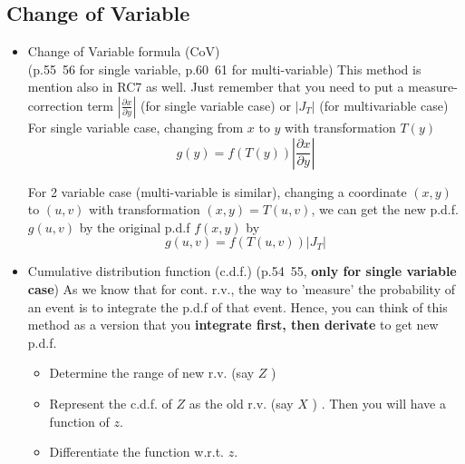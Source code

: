 \subsection*{Change of Variable}
\begin{itemize}
   \item Change of Variable formula (CoV) \\
   (p.55~56 for single variable, p.60~61 for multi-variable) 
   This method is mention also in RC7 as well. Just remember that you need to put a measure-correction term $\left\vert \frac{\partial x}{\partial y} \right\vert $ (for single variable case) or \(\left\vert J_T \right\vert \) (for multivariable case) \\
   For single variable case, changing from $x$ to $y$ with transformation $T(y)$  
   \[
    g(y) = f(T(y)) \left\vert \frac{\partial x}{\partial y} \right\vert 
   \]  
    
   For 2 variable case (multi-variable is similar), changing a coordinate $(x,y)$ to \((u,v)\) with transformation $(x,y) = T(u,v)$, we can get the new p.d.f. $g(u,v)$ by the original p.d.f $f(x,y)$  by 
   \[
    g(u,v) = f(T(u,v)) \left| J_T \right|
   \]
   \item Cumulative distribution function (c.d.f.) 
   (p.54~55, \textbf{only for single variable case})
   As we know that for cont. r.v., the way to 'measure' the probability of an event is to integrate the p.d.f of that event. 
   Hence, you can think of this method as a version that you \textbf{integrate first, then derivate} to get new p.d.f. 
   \begin{itemize}
       \item Determine the range of new r.v. (say \(Z\) )
       \item Represent the c.d.f. of \(Z\)  as the old r.v. (say \(X\) ) . Then you will have a function of \(z\). 
       \item Differentiate the function w.r.t. \(z\).  
   \end{itemize}
\end{itemize}